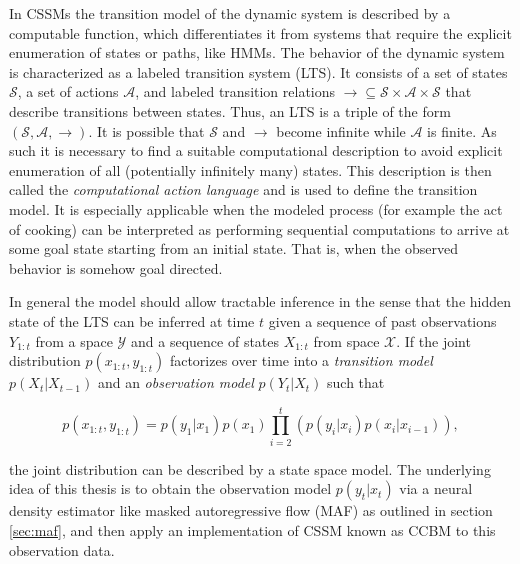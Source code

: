 \documentclass[11pt,titlepage,oneside,openany]{book}
\begin{document}
In CSSMs the transition model of the dynamic system is described by a computable function, which differentiates it from systems that require the explicit enumeration of states or paths, like HMMs. The behavior of the dynamic system is characterized as a labeled transition system (LTS). It consists of a set of states $\mathcal{S}$, a set of actions $\mathcal{A}$, and labeled transition relations $\rightarrow \subseteq \mathcal{S} \times \mathcal{A} \times \mathcal{S}$ that describe transitions between states. Thus, an LTS is a triple of the form $(\mathcal{S}, \mathcal{A}, \rightarrow)$. It is possible that $\mathcal{S}$ and $\rightarrow$ become infinite while $\mathcal{A}$ is finite. As such it is necessary to find a suitable computational description to avoid explicit enumeration of all (potentially infinitely many) states. This description is then called the \emph{computational action language} and is used to define the transition model. It is especially applicable when the modeled process (for example the act of cooking) can be interpreted as performing sequential computations to arrive at some goal state starting from an initial state. That is, when the observed behavior is somehow goal directed.

In general the model should allow tractable inference in the sense that the hidden state of the LTS can be inferred at time $t$ given a sequence of past observations $Y_{1:t}$ from a space $\mathcal{Y}$ and a sequence of states $X_{1:t}$ from space $\mathcal{X}$. If the joint distribution $p(x_{1:t}, y_{1:t})$ factorizes over time into a \emph{transition model} $p(X_t|X_{t-1})$ and an \emph{observation model} $p(Y_t|X_t)$ such that

\begin{equation}
	\label{func:ssm}
	p(x_{1:t}, y_{1:t}) = p(y_1|x_1)p(x_1) \prod_{i=2}^{t} (p(y_i|x_i)p(x_i|x_{i-1})),
\end{equation}

\noindent the joint distribution can be described by a state space model. The underlying idea of this thesis is to obtain the observation model $p(y_t|x_t)$ via a neural density estimator like masked autoregressive flow (MAF) as outlined in section \ref{sec:maf}, and then apply an implementation of CSSM known as CCBM to this observation data.   
\end{document}
